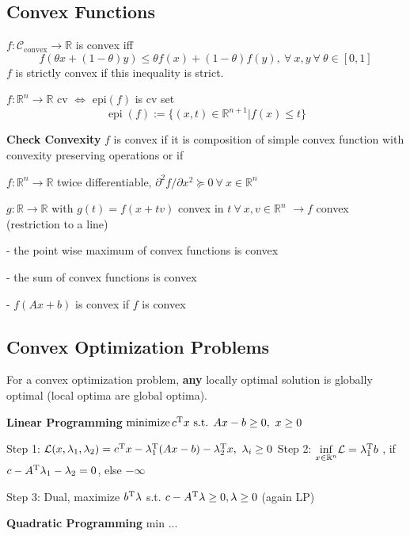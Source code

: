 
\subsection{Convex Functions}

\begin{definition}
	$f: \mathcal{C}_\text{convex} \to\mathbb{R}$ is convex iff
	\[
		f(\theta x + (1-\theta)y)\le \theta f(x)+ (1-\theta)f(y),
		\ \forall\ x,y
		\ \forall\ \theta \in [0,1]\]
	$f$ is strictly convex if this inequality is strict.
\end{definition}


\begin{definition}[Epigraph]
	$f:\mathbb{R}^n \rightarrow \mathbb{R}$ cv
	$\Leftrightarrow$
	epi$(f)$ is cv set
	$$\operatorname{epi}(f):=\{(x,t)\in \mathbb{R}^{n+1} | f(x)\le t\}$$
\end{definition}

\textbf{Check Convexity} $f$ is convex if it is
composition of simple convex function
with convexity preserving operations
or if


$f: \mathbb{R}^n \rightarrow \mathbb{R}$ twice differentiable,
$\partial^2f/\partial x^2 \succeq 0\ \forall\ x \in \mathbb{R}^{n}$

$g: \mathbb{R} \rightarrow \mathbb{R}$ with $g(t)=f(x+tv)$
convex in $t\ \forall\ x,v \in \mathbb{R}^{n}$
$\rightarrow f$ convex (restriction to a line)


- the point wise maximum of convex functions is convex

- the sum of convex functions is convex

- $f(Ax+b)$ is convex if $f$ is convex





\subsection{Convex Optimization Problems}

\begin{theorem}
	For a convex optimization problem,
	\textbf{any} locally optimal solution is globally
	optimal (local optima are global optima).
\end{theorem}

\textbf{Linear Programming}
$ \operatorname{minimize} c^\textnormal{\scriptsize T} x
	\text{ s.t. } Ax-b \ge 0,\ x\ge0$

Step 1:
$\mathcal{L}(x,\lambda_1,\lambda_2) =
	c^\textnormal{\scriptsize T} x-\lambda_1^\textnormal{\scriptsize T} (Ax-b) -\lambda_2^\textnormal{\scriptsize T} x,\ \lambda_i \ge0$
Step 2:
$\underset{x \in \mathcal{\mathbb{R}}^n}{\operatorname{inf}}
	\mathcal{L}=\lambda_1^\textnormal{\scriptsize T} b$
, if $c-A^\textnormal{\scriptsize T}\lambda_1-\lambda_2=0$, else $-\infty$

Step 3: Dual,
maximize $b^\textnormal{\scriptsize T}\lambda$
s.t.
$c-A^\textnormal{\scriptsize T}\lambda\ge0,\lambda\ge0$
(again LP)

\textbf{Quadratic Programming}
min ...

